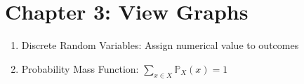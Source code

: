 \section*{Chapter 3: View Graphs}
\begin{enumerate}
    \item Discrete Random Variables: Assign numerical value to outcomes
    \item Probability Mass Function: $\sum_{x\in X}\mathbb{P}_X(x)=1$
\end{enumerate}